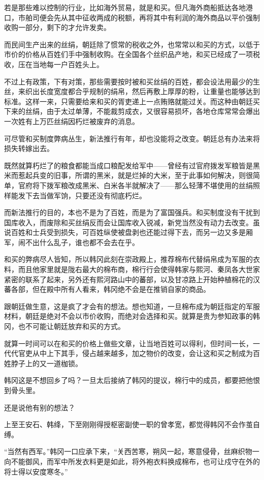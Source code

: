 若是那些难以控制的行业，比如海外贸易，就是和买。但凡海外商船抵达各地港口，市舶司便会先从其中征收两成的税额，再将其中有利润的海外商品以平价强制收购一部分，剩下的才允许发卖。

而民间生产出来的丝绢，朝廷除了惯常的税收之外，也常常以和买的方式，以低于市价的价格从百姓们手中强制收购。在全国各个丝织品产地，和买已经成了一项税收，压在当地每一户百姓头上。

不过上有政策，下有对策，那些需要按时被和买丝绢的百姓，都会设法用最少的生丝，来织出长度宽度都合乎规制的绢帛，然后再敷上厚厚的粉，让重量也能够达到标准。这样一来，只需要给来和买的胥吏递上一点贿赂就能过关。而这种由朝廷买下来的丝绢，由于太过单薄，不能裁剪成衣，又很容易损坏，各地仓库常常会爆出一次姓有上万匹丝绢因朽烂被废弃的消息。

可尽管和买制度弊病丛生，新法推行有年，却也没能将之改变。朝廷总有办法来将损失转嫁出去。

既然就算朽烂了的粮食都能当成口粮配发给军中——曾经有过官府拨发军粮皆是黑米而惹起兵变的旧事，所谓的黑米，就是烂掉的大米，至于此事如何解决，则很简单，官府将下拨军粮改成黑米、白米各半就解决了——那么轻薄不堪使用的丝绢照样能发下去当做军饷，只要还没有彻底朽烂。

而新法推行的目的，本也不是为了百姓，而是为了富国强兵。和买制度没有干扰到国库收入，而废除和买丝绢反而会让国库收入锐减，新党当然没有动力去改变。虽说百姓和士兵受到损失，可百姓纵使被盘剥也还能过得下去，而另一边又多是厢军，闹不出什么乱子，谁也都不会去在乎。

和买的弊病尽人皆知，所以韩冈此刻在崇政殿上，推荐棉布代替绢帛成为军服的衣料，而且他家里就是陇右最大的棉布商，棉行行会使得韩家与熙河、秦凤各大世家紧密的联系了起来，另外还有熙河路山中的蕃部，以及甘凉路上开始种植棉花的汉蕃各部，但在殿中所有人看来，韩冈绝不会是在推销自家的商品。

跟朝廷做生意，这是疯了才会有的想法。想也知道，一旦棉布成为朝廷指定的军服材料，朝廷是绝对不会以市价收购，而绝对会选择和买。就算是贵为参知政事的韩冈，也不可能让朝廷放弃和买的方式。

就算一时间可以在和买的价格上做些文章，让当地百姓可以得利，但时间一长，一代代官吏从中上下其手，侵占越来越多，加之物价的改变，会让这和买之制成为百姓脖子上的又一道枷锁。

韩冈这是不想回乡了吗？一旦太后接纳了韩冈的提议，棉行中的成员，都要把他恨到骨头里。

还是说他有别的想法？

上至王安石、韩绛，下至刚刚得授枢密副使一职的曾孝宽，都觉得韩冈不会作茧自缚。

“当然有西军。”韩冈一口应承下来，“关西苦寒，朔风一起，寒意侵骨，丝麻织物一向不能御风，而军中所发衣料更是如此，将外袍衣料换成棉布，也可让戍守在外的将士得以安度寒冬。”

